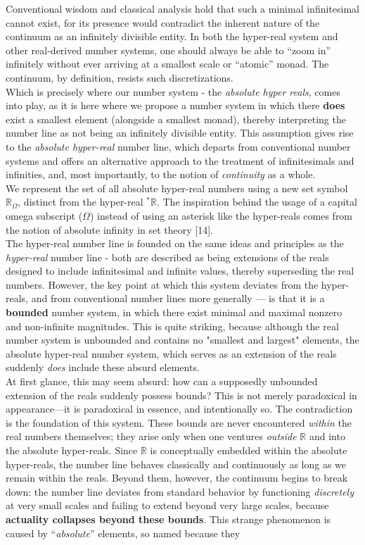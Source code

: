 \documentclass{article}
\begin{document}
Conventional wisdom and classical analysis hold that such a minimal infinitesimal cannot exist, for its presence would contradict the inherent nature of the continuum as an infinitely divisible entity. In both the hyper-real system and other real-derived number systems, one should always be able to “zoom in” infinitely without ever arriving at a smallest scale or “atomic” monad. The continuum, by definition, resists such discretizations. \\ Which is precisely where our number system - the \textit{absolute hyper reals}, comes into play, as it is here where we propose a number system in which there \textbf{does} exist a smallest element (alongside a smallest monad), thereby interpreting the number line as not being an infinitely divisible entity. This assumption gives rise to the \textit{absolute hyper-real} number line, which departs from conventional number systems and offers an alternative approach to the treatment of infinitesimals and infinities, and, most importantly, to the notion of \emph{continuity} as a whole.\\ We represent the set of all absolute hyper-real numbers using a new set symbol $\mathbb{R}_\Omega$, distinct from the hyper-real ${}^\ast\mathbb{R}$. The inspiration behind the usage of a capital omega subscript ($\Omega$) instead of using an asterisk like the hyper-reals comes from the notion of absolute infinity in set theory [14]. \\ The hyper-real number line is founded on the same ideas and principles as the \textit{hyper-real} number line - both are described as being extensions of the reals designed to include infinitesimal and infinite values, thereby superseding the real numbers. However, the key point at which this system deviates from the hyper-reals, and from conventional number lines more generally --- is that it is a \textbf{bounded} number system, in which there exist minimal and maximal nonzero and non-infinite magnitudes. This is quite striking, because although the real number system is unbounded and contains no "smallest and largest" elements, the absolute hyper-real number system, which serves as an extension of the reals suddenly \textit{does} include these absurd elements.\\At first glance, this may seem absurd: how can a supposedly unbounded extension of the reals suddenly possess bounds? This is not merely paradoxical in appearance---it is paradoxical in essence, and intentionally so. The contradiction is the foundation of this system. These bounds are never encountered \textit{within} the real numbers themselves; they arise only when one ventures \textit{outside} $\mathbb{R}$ and into the absolute hyper-reals. Since $\mathbb{R}$ is conceptually embedded within the absolute hyper-reals, the number line behaves classically and continuously as long as we remain within the reals. Beyond them, however, the continuum begins to break down: the number line deviates from standard behavior by functioning \textit{discretely} at very small scales and failing to extend beyond very large scales, because \textbf{actuality collapses beyond these bounds}. This strange phenomenon is caused by ``\textit{absolute}'' elements, so named because they 
\end{document}
